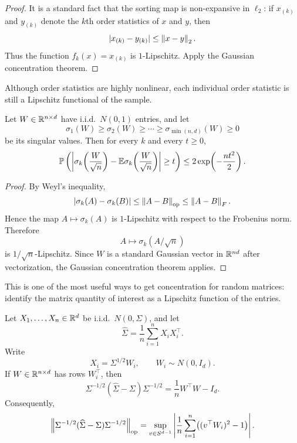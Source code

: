 \begin{proof}
It is a standard fact that the sorting map is non-expansive in $\ell_2$: if $x_{(k)}$ and $y_{(k)}$ denote the $k$th order statistics of $x$ and $y$, then
\[
|x_{(k)}-y_{(k)}|\le \left\lVert x-y\right\rVert_2.
\]
Thus the function $f_k(x)=x_{(k)}$ is $1$-Lipschitz. Apply the Gaussian concentration theorem.
\end{proof}

\begin{remark}
Although order statistics are highly nonlinear, each individual order statistic is still a Lipschitz functional of the sample.
\end{remark}


\begin{cor}
Let $W\in \mathbb{R}^{n\times d}$ have i.i.d.\ $N(0,1)$ entries, and let
\[
\sigma_1(W)\ge \sigma_2(W)\ge \cdots \ge \sigma_{\min(n,d)}(W)\ge 0
\]
be its singular values. Then for every $k$ and every $t\ge 0$,
\[
\mathbb{P}\left(
\left|
\sigma_k\!\left(\frac{W}{\sqrt n}\right)
-
\mathbb{E} \sigma_k\!\left(\frac{W}{\sqrt n}\right)
\right|
\ge t
\right)
\le
2\exp\!\left(-\frac{nt^2}{2}\right).
\]
\end{cor}

\begin{proof}
By Weyl's inequality,
\[
|\sigma_k(A)-\sigma_k(B)|\le \left\lVert A-B\right\rVert_{\mathrm{op}}\le \left\lVert A-B\right\rVert_F.
\]
Hence the map $A\mapsto \sigma_k(A)$ is $1$-Lipschitz with respect to the Frobenius norm. Therefore
\[
A\mapsto \sigma_k(A/\sqrt n)
\]
is $1/\sqrt n$-Lipschitz. Since $W$ is a standard Gaussian vector in $\mathbb{R}^{nd}$ after vectorization, the Gaussian concentration theorem applies.
\end{proof}

\begin{remark}
This is one of the most useful ways to get concentration for random matrices: identify the matrix quantity of interest as a Lipschitz function of the entries.
\end{remark}

\begin{lem}
Let $X_1,\dots,X_n\in \mathbb{R}^d$ be i.i.d.\ $N(0,\Sigma)$, and let
\[
\widehat\Sigma=\frac1n\sum_{i=1}^n X_iX_i^\top.
\]
Write
\[
X_i=\Sigma^{1/2}W_i,
\qquad
W_i\sim N(0,I_d).
\]
If $W\in \mathbb{R}^{n\times d}$ has rows $W_i^\top$, then
\[
\Sigma^{-1/2}(\widehat\Sigma-\Sigma)\Sigma^{-1/2}
=
\frac1n W^\top W-I_d.
\]
Consequently,
\[
\left\lVert\Sigma^{-1/2}(\widehat\Sigma-\Sigma)\Sigma^{-1/2}\right\rVert_{\mathrm{op}}
=
\sup_{v\in S^{d-1}}
\left|
\frac1n\sum_{i=1}^n \bigl((v^\top W_i)^2-1\bigr)
\right|.
\]
\end{lem}

